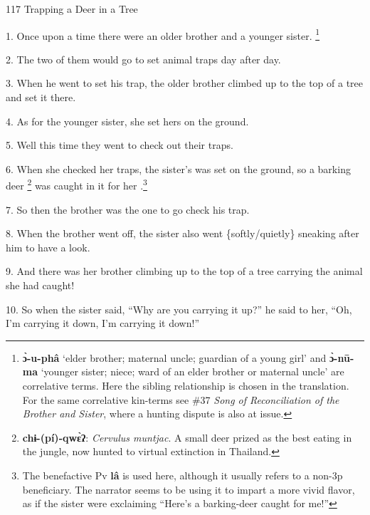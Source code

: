 
117 Trapping a Deer in a Tree

1. Once upon a time there were an older brother and a younger sister. \footnote{\textbf{ɔ̀-u-phâ} `elder brother; maternal uncle; guardian of a young girl' and \textbf{ɔ̀-nū-ma }`younger sister; niece; ward of an elder brother or maternal uncle' are correlative terms.  Here the sibling relationship is chosen in the translation. For the same correlative kin-terms see \#37 \textit{Song of Reconciliation of the Brother and Sister}, where a hunting dispute is also at issue.}

2. The two of them would go to set animal traps day after day.

3. When he went to set his trap, the older brother climbed up to the top of a tree
and set it there.

4. As for the younger sister, she set hers on the ground.

5. Well this time they went to check out their traps.

6. When she checked her traps, the sister's was set on the ground, so a barking
deer \footnote{\textbf{chɨ-(pí)-qwɛ̀ʔ}: \textit{Cervulus muntjac}. A small deer prized as the best eating in the jungle, now hunted to virtual extinction in Thailand.} was caught in it for her .\footnote{The benefactive Pv \textbf{lâ} is used here, although it usually refers to a non-3p beneficiary. The narrator seems to be using it to impart a more vivid flavor, as if the sister were exclaiming ``Here's a barking-deer caught for me!''}

7. So then the brother was the one to go check his trap.

8. When the brother went off, the sister also went \{softly/quietly\} sneaking
after him to have a look.

9. And there was her brother climbing up to the top of a tree carrying the animal
she had caught!

10. So when the sister said, ``Why are you carrying it up?'' he said to her, ``Oh,
I'm carrying it down, I'm carrying it down!''

